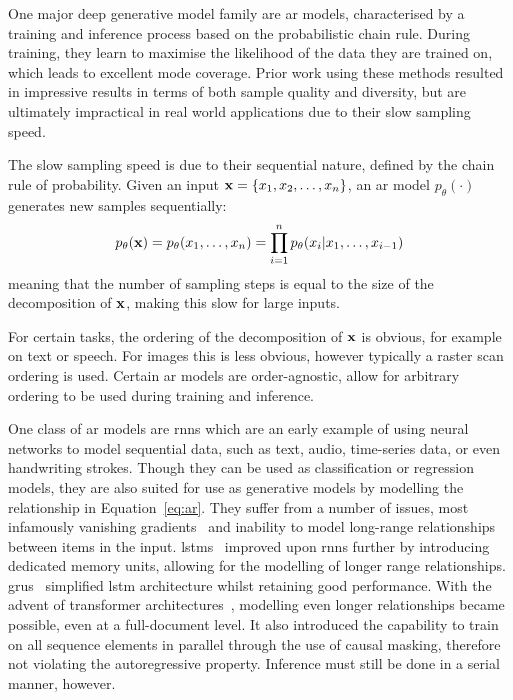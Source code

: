 One major deep generative model family are \acrfull{ar} models, characterised by
a training and inference process based on the probabilistic chain rule. During
training, they learn to maximise the likelihood of the data they are
trained on, which leads to excellent mode coverage. Prior work using these
methods resulted in impressive results in terms of both sample quality and
diversity, but are ultimately impractical in real world applications due to
their slow sampling speed.

The slow sampling speed is due to their sequential nature, defined by the chain
rule of probability. Given an input $\mathbf{x} = \{ x_{1}, x_{2}, \dots,
x_{n} \}$, an \gls{ar} model $p_\theta(\cdot)$ generates new
samples sequentially:
\begin{equation}\label{eq:ar}
    p_\theta(\mathbf{x}) = p_\theta(x_{1}, \dots, x_{n}) =
    \prod\limits^{n}_{i=1} p_\theta(x_{i} \vert x_{1}, \dots, x_{i-1})
\end{equation}
meaning that the number of sampling steps is equal to the size of the
decomposition of $\mathbf{x}$, making this slow for large inputs.

For certain tasks, the ordering of the decomposition of $\mathbf{x}$ is obvious, for
example on text or speech. For images this is less obvious, however typically a
raster scan ordering is used. Certain \gls{ar} models are order-agnostic,
allow for arbitrary ordering to be used during training and inference.

One class of \gls{ar} models are \glspl{rnn} which are an early example of using
neural networks to model sequential data, such as text, audio, time-series data,
or even handwriting strokes. Though they can be used as classification or
regression models, they are also suited for use as generative models by
modelling the relationship in Equation~\ref{eq:ar}. They suffer from a number of
issues, most infamously vanishing gradients~\cite{pascanu2012rnn} and inability
to model long-range relationships between items in the input.
\Glspl{lstm}~\cite{hoch1997lstm} improved upon \glspl{rnn} further by
introducing dedicated memory units, allowing for the modelling of longer range
relationships. \Glspl{gru}~\cite{cho2014gru} simplified \gls{lstm} architecture
whilst retaining good performance. With the advent of transformer
architectures~\cite{vaswani2017attention}, modelling even longer relationships
became possible, even at a full-document level. It also introduced the
capability to train on all sequence elements in parallel through the use of
causal masking, therefore not violating the autoregressive property. Inference
must still be done in a serial manner, however.

